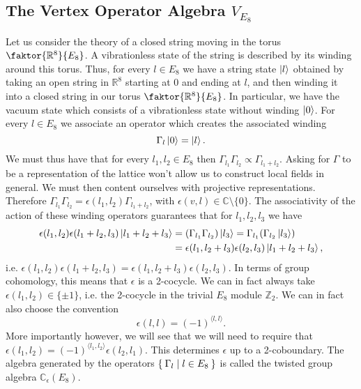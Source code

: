 \documentclass{article}
\begin{document}
\subsection{The Vertex Operator Algebra \texorpdfstring{$V_{E_8}$}{VE8}}

Let us consider the theory of a closed string moving in the torus $\faktor{\mathbb{R}^8}{E_8}$. A vibrationless state of the string is described by its winding around this torus. Thus, for every $l\in E_8$ we have a string state $\ket{l}$ obtained by taking an open string in $\mathbb{R}^8$ starting at $0$ and ending at $l$, and then winding it into a closed string in our torus $\faktor{\mathbb{R}^8}{E_8}$. In particular, we have the vacuum state which consists of a vibrationless state without winding $\ket{0}$. For every $l\in E_8$ we associate an operator which creates the associated winding
\begin{equation}
\Gamma_{l}\ket{0}=\ket{l}.
\end{equation}
We must thus have that for every $l_1,l_2\in E_8$ then $\Gamma_{l_1}\Gamma_{l_2}\propto\Gamma_{l_1+l_2}$. Asking for $\Gamma$ to be a representation of the lattice won't allow us to construct local fields in general. We must then content ourselves with projective representations. Therefore $\Gamma_{l_1}\Gamma_{l_2}=\epsilon(l_1,l_2)\Gamma_{l_1+l_2}$, with $\epsilon(v,l)\in\mathbb{C}\setminus\{0\}$. The associativity of the action of these winding operators guarantees that for $l_1,l_2,l_3$ we have
\begin{equation}
\begin{aligned}
\epsilon(l_1,l_2)\epsilon(l_1+l_2,l_3)\ket{l_1+l_2+l_3}&=(\Gamma_{l_1}\Gamma_{l_2})\ket{l_3}=\Gamma_{l_1}(\Gamma_{l_2}\ket{l_3})\\
&=\epsilon(l_1,l_2+l_3)\epsilon(l_2,l_3)\ket{l_1+l_2+l_3},
\end{aligned}
\end{equation}
i.e. $\epsilon(l_1,l_2)\epsilon(l_1+l_2,l_3)=\epsilon(l_1,l_2+l_3)\epsilon(l_2,l_3)$. In terms of group cohomology, this means that $\epsilon$ is a 2-cocycle. We can in fact always take $\epsilon(l_1,l_2)\in\{\pm1\}$, i.e. the 2-cocycle in the trivial $E_8$ module $\mathbb{Z}_2$. We can in fact also choose the convention
\begin{equation}
\epsilon(l,l)=(-1)^{\langle l,l\rangle}.
\end{equation} 
More importantly however, we will see that we will need to require that $\epsilon(l_1,l_2)=(-1)^{\langle l_1,l_2\rangle}\epsilon(l_2,l_1)$. This determines $\epsilon$ up to a 2-coboundary. The algebra generated by the operators $\Set{\Gamma_l|l\in E_8}$ is called the twisted group algebra $\mathbb{C}_\epsilon(E_8)$.
\end{document}
